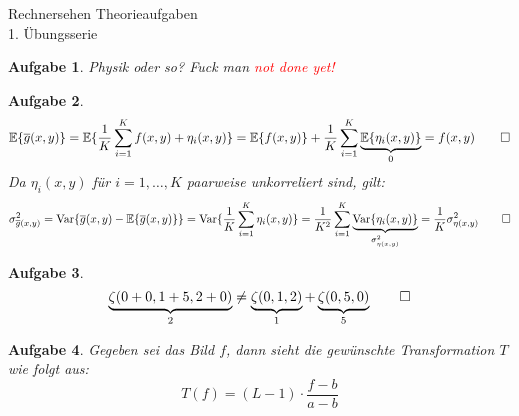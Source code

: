 \documentclass[11pt]{article}
\theoremstyle{break}
\newtheorem{task}{Aufgabe}
\newcommand{\set}[1]{\{#1\}}
\newcommand{\expected}[1]{\mathbb{E}\set{#1}}
\newcommand{\variance}[1]{\text{Var}\set{#1}}
\def\ndy{
    \textcolor{red} {\hfill not done yet!}
    \reversemarginpar
    \marginpar{\raggedleft\textcolor{red}{\rule{2mm}{2mm}}}
}
\newcommand{\hw}{1}
\begin{document}
\begin{center}
\Large{Rechnersehen Theorieaufgaben}\\
\large{\hw. Übungsserie}
\end{center}
\begin{task}
    Physik oder so? Fuck man \ndy
\end{task}

\begin{task}
    $$\expected{\overline{g}(x, y)} = \expected{\frac{1}{K}\sum\limits_{i=1}^K f(x, y) + \eta_i(x, y)} = \expected{f(x, y)} + \frac{1}{K} \sum\limits_{i=1}^K \underbrace{\expected{\eta_i(x, y)}}_0 = f(x, y) \qed$$
    Da $\eta_i(x, y)$ für $i = 1,\dots,K$ paarweise unkorreliert sind, gilt:
    $$\sigma^2_{\overline{g}(x,y)} = \variance{\overline{g}(x,y) - \expected{\overline{g}(x,y)}} = \variance{\frac{1}{K} \sum\limits_{i=1}^K \eta_i(x, y)} = \frac{1}{K^2} \sum\limits_{i=1}^K \underbrace{\variance{\eta_i(x, y)}}_{\sigma^2_{\eta(x, y)}} = \frac{1}{K} \sigma^2_{\eta(x, y)} \qed$$
\end{task}

\begin{task}
    $$\underbrace{\zeta (0 + 0, 1 + 5, 2 + 0)}_2 \neq \underbrace{\zeta (0, 1, 2)}_1 + \underbrace{\zeta (0, 5, 0)}_5 \qed$$
\end{task}

\begin{task}
    Gegeben sei das Bild $f$, dann sieht die gewünschte Transformation $T$ wie folgt aus:
    $$T(f) = (L - 1)\cdot \frac{f - b}{a - b}$$
\end{task}
\end{document}
